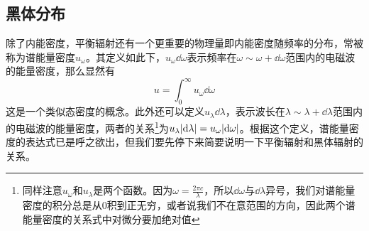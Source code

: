 \documentclass[../../main.tex]{subfiles}
\begin{document}
\subsection{黑体分布}
除了内能密度，平衡辐射还有一个更重要的物理量即内能密度随频率的分布，常被称为谱能量密度\(u_{\omega}\)。其定义如此下，\(u_{\omega}\dd \omega\)表示频率在\(\omega\sim\omega+\dd\omega\)范围内的电磁波的能量密度，那么显然有
\begin{equation}
    u=\int_0^{\infty}u_{\omega}\dd \omega
\end{equation}
这是一个类似态密度的概念。此外还可以定义\(u_{\lambda}\dd \lambda\)，表示波长在\(\lambda\sim\lambda+\dd\lambda\)范围内的电磁波的能量密度，两者的关系\footnote{同样注意\(u_{\omega}\)和\(u_{\lambda}\)是两个函数。因为\(\omega=\frac{2\pi c}{\lambda}\)，所以\(\dd\omega\)与\(\dd\lambda\)异号，我们对谱能量密度的积分总是从0积到正无穷，或者说我们不在意范围的方向，因此两个谱能量密度的关系式中对微分要加绝对值}为\(u_{\lambda}\abs{\dd\lambda}=u_{\omega}\abs{\dd\omega}\)。根据这个定义，谱能量密度的表达式已是呼之欲出，但我们要先停下来简要说明一下平衡辐射和黑体辐射的关系。
\end{document}
